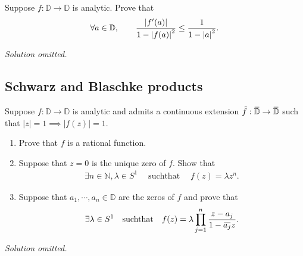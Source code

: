 \begin{problem}[?]

Suppose \(f:{\mathbb{D}}\to {\mathbb{D}}\) is analytic. Prove that
\begin{align*}  
\forall a\in {\mathbb{D}}, \qquad {{\left\lvert {f'(a)} \right\rvert} \over 1 - {\left\lvert {f(a)} \right\rvert}^2 } \leq {1 \over 1 - {\left\lvert {a} \right\rvert}^2}
.\end{align*}

\end{problem}

\emph{Solution omitted.}

\hypertarget{schwarz-and-blaschke-products}{%
\subsection{Schwarz and Blaschke
products}\label{schwarz-and-blaschke-products}}

\begin{problem}[?]

Suppose \(f:{\mathbb{D}}\to{\mathbb{D}}\) is analytic and admits a
continuous extension
\(\tilde f: \mkern 1.5mu\overline{\mkern-1.5mu{\mathbb{D}}\mkern-1.5mu}\mkern 1.5mu\to \mkern 1.5mu\overline{\mkern-1.5mu{\mathbb{D}}\mkern-1.5mu}\mkern 1.5mu\)
such that
\({\left\lvert {z} \right\rvert} = 1 \implies {\left\lvert {f(z)} \right\rvert} = 1\).

\begin{enumerate}
\def\labelenumi{\alph{enumi}.}
\item
  Prove that \(f\) is a rational function.
\item
  Suppose that \(z=0\) is the unique zero of \(f\). Show that
  \begin{align*}  
  \exists n\in {\mathbb{N}}, \lambda \in S^1 {\quad \operatorname{ such that } \quad}f(z) = \lambda z^n
  .\end{align*}
\item
  Suppose that \(a_1, \cdots, a_n \in {\mathbb{D}}\) are the zeros of
  \(f\) and prove that
  \begin{align*}  
  \exists \lambda \in S^1 {\quad \operatorname{such that} \quad} f(z) = \lambda \prod_{j=1}^n {z - a_j \over 1 - \mkern 1.5mu\overline{\mkern-1.5mua_j\mkern-1.5mu}\mkern 1.5mu z}
  .\end{align*}
\end{enumerate}

\end{problem}

\emph{Solution omitted.}

